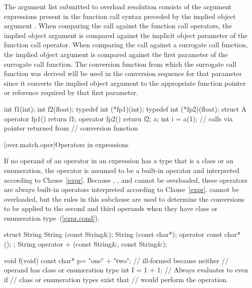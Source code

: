 \pnum
The argument list submitted to overload resolution consists of
the argument expressions present in the function call syntax
preceded by the implied object argument
.
\enternote
When comparing the
call against the function call operators, the implied object
argument is compared against the implicit object parameter of the
function call operator.
When comparing the call against a
surrogate call function, the implied object argument is compared
against the first parameter of the surrogate call function.
The
conversion function from which the surrogate call function was
derived will be used in the conversion sequence for that
parameter since it converts the implied object argument to the
appropriate function pointer or reference required by that first
parameter.
\exitnote
\enterexample

\begin{codeblock}
int f1(int);
int f2(float);
typedef int (*fp1)(int);
typedef int (*fp2)(float);
struct A {
  operator fp1() { return f1; }
  operator fp2() { return f2; }
} a;
int i = a(1);       // calls  via pointer returned from
                    // conversion function
\end{codeblock}
\exitexample%

[over.match.oper]{Operators in expressions}%

\pnum
If no operand of an operator in an expression has a type that is a class
or an enumeration, the operator is assumed to be a built-in operator
and interpreted according to Clause~\ref{expr}.
\enternote
Because
,
,
and
\tcode{::}
cannot be overloaded,
these operators are always built-in operators interpreted according to
Clause~\ref{expr}.
cannot be overloaded, but the rules in this subclause are used to determine
the conversions to be applied to the second and third operands when they
have class or enumeration type~(\ref{expr.cond}).
\exitnote
\enterexample

\begin{codeblock}
struct String {
  String (const String&);
  String (const char*);
  operator const char* ();
};
String operator + (const String&, const String&);

void f(void) {
 const char* p= "one" + "two";  // ill-formed because neither
                                // operand has class or enumeration type
 int I = 1 + 1;                 // Always evaluates to  even if
                                // class or enumeration types exist that
                                // would perform the operation.
}
\end{codeblock}
\exitexample

